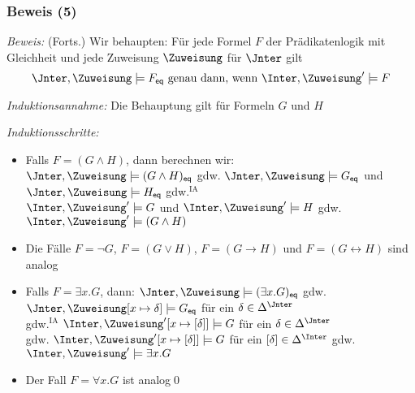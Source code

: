\documentclass[aspectratio=1610,onlymath]{beamer}
\begin{document}
\begin{frame}[t]\frametitle{Beweis (5)}


\emph{Beweis:} {\footnotesize(Forts.)}
Wir behaupten: Für jede Formel $F$ der Prädikatenlogik mit Gleichheit und jede Zuweisung $\Zuweisung$ für $\Jnter$ gilt
\[ \Jnter,\Zuweisung\models F_{\eqpred} \text{ genau dann, wenn } \Inter,\Zuweisung'\models F \]


\emph{Induktionsannahme:} Die Behauptung gilt für Formeln $G$ und $H$ \medskip\pause

\emph{Induktionsschritte:}
\begin{itemize}
\item Falls $F=(G\wedge H)$, dann berechnen wir:\pause\\
$\Jnter,\Zuweisung\models (G\wedge H)_{\eqpred}$
\alert{gdw.} $\Jnter,\Zuweisung\models G_{\eqpred}$ und $\Jnter,\Zuweisung\models H_{\eqpred}$ \pause\alert{gdw.${}^{\text{IA}}$}\\
$\Inter,\Zuweisung'\models G$ und $\Inter,\Zuweisung'\models H$ \pause\alert{gdw.} $\Inter,\Zuweisung'\models (G\wedge H)$\pause
\item Die Fälle $F=\neg G$, $F=(G\vee H)$, $F=(G\to H)$ und $F=(G\leftrightarrow H)$ sind analog\pause
\item Falls $F=\exists x.G$, dann: $\Jnter,\Zuweisung\models (\exists x.G)_{\eqpred}$ \alert{gdw.}
$\Jnter,\Zuweisung[x\mapsto \delta]\models G_{\eqpred}$ für ein $\delta\in\Delta^\Jnter$\\
\pause\alert{gdw.${}^{\text{IA}}$}
$\Inter,\Zuweisung'[x\mapsto [\delta]]\models G$ für ein $\delta\in\Delta^\Jnter$
 \pause\\\alert{gdw.}
 $\Inter,\Zuweisung'[x\mapsto [\delta]]\models G$ für ein $[\delta]\in\Delta^\Inter$
\alert{gdw.} $\Inter,\Zuweisung'\models \exists x.G$\pause
\item Der Fall $F=\forall x.G$ ist analog\qed
\end{itemize}
\end{frame}
\end{document}
